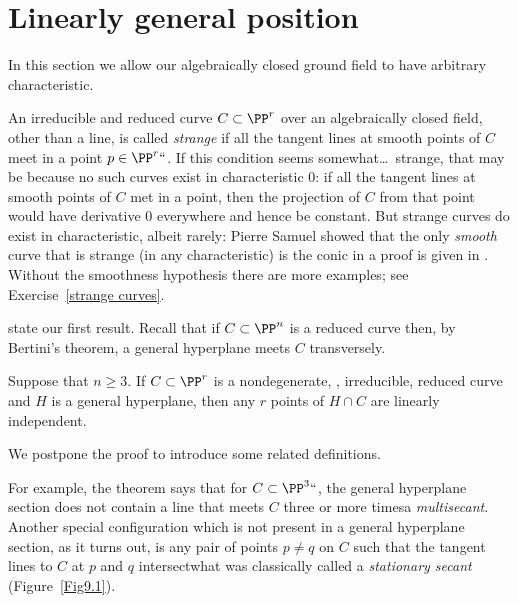 \section{Linearly general position}\label{linearly general position
section}
In this section we 
allow our algebraically closed ground field to
have arbitrary characteristic.

An irreducible and reduced curve
$C\subset \PP^r$ over an algebraically closed field, 
other than a
%
line, is called \emph{strange} if
all the tangent lines at smooth points of $C$ meet in a point $p\in \PP^r``$. 
If this condition seems somewhat\dots\ strange, that may be because no
such curves exist in characteristic 0: if 
all the
tangent lines at smooth points of $C$ met in a point, then the projection
of $C$ from that point would have derivative 0 everywhere and hence be
constant. But strange curves do exist in 
characteristic, albeit
%
rarely: Pierre Samuel showed that the only \emph{smooth} curve that is
strange (in any characteristic) is the conic in 
%
a proof
is given in \cite[Theorem IV.3.9]{Hartshorne1977}. Without the smoothness
hypothesis there are more examples; see Exercise~\ref{strange curves}.

 state our first result. Recall that if
$C\subset \PP^n$ is a reduced curve then, by Bertini's theorem, a general
%
hyperplane meets $C$ transversely.

\begin{npt}
\begin{theorem}
\label{basic linear independence}\label{linear general position}
%
Suppose that $n\geq 3$. If $C\subset \PP^r$ is a nondegenerate,
,
irreducible, reduced curve
and $H$ is a general hyperplane, then any $r$ points of $H\cap C$ are
linearly independent.
\unif
\end{theorem}
\end{npt}

We postpone the proof to introduce some related definitions.

For example, the theorem says that for $C \subset \PP^3` `$, the general
hyperplane section does not contain a line
%
that meets $C$ three or more times\emdash a \emph{multisecant}. Another
special configuration which is not present in a general hyperplane
section, as it turns out,
is any pair of points $p\neq q$ on $C$ such that the tangent lines
to $C$ at $p$ and $q$ intersect\emdash what was
classically
%
called a 
\textit{stationary secant}
(Figure~\ref{Fig9.1}).

